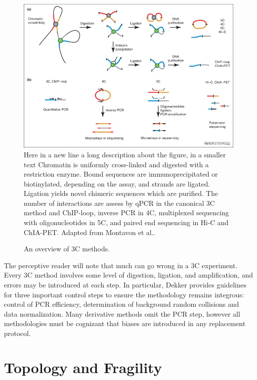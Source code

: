 \begin{figure}[b]
  \centering
  \caption{An overview of \gls{3C} methods.}\label{fi:captureTechniques}
  \includegraphics[width=\textwidth]{fig/CompareChromosomeCapture}
  \medskip
  \small
  Here in a new line a long description about the figure, in a smaller text
  Chromatin is uniformly cross-linked and digested with a restriction enzyme.
  Bound sequences are immunoprecipitated or biotinylated, depending on the
  assay, and strands are ligated.  Ligation yields novel chimeric sequences
  which are purified.  The number of interactions are assess by qPCR in
  the canonical \gls{3C} method and ChIP-loop, inverse PCR in 4C, multiplexed
  sequencing with oligonucleotides in 5C, and paired end sequencing in Hi-C
  and ChIA-PET\@.  Adapted from Montavon et al.\cite{montavon2012}.
\end{figure}


The perceptive reader will note that much can go wrong in a \gls{3C} experiment. Every \gls{3C} method involves some level of digestion, ligation,
and amplification, and errors may be introduced at each step.  In particular, Dekker provides guidelines for three important control steps to
ensure the methodology remains integrous: control of PCR efficiency, determination of background random collisions and data
normalization\cite{dekker2006}.  Many derivative methods omit the PCR step, however all methodologies must be cognizant that
biases are introduced in any replacement protocol.

\section*{Topology and Fragility}

